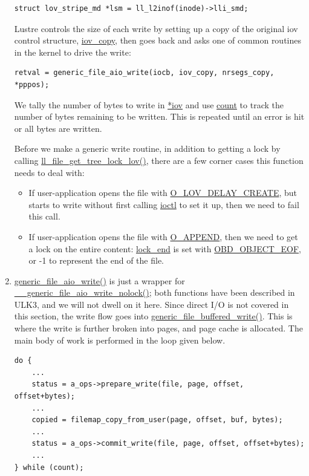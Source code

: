 \begin{enumerate}
\begin{Verbatim} 
struct lov_stripe_md *lsm = ll_l2inof(inode)->lli_smd; 
\end{Verbatim}

Lustre controls the size of each write by setting up a copy of the original iov
control structure, \url{iov_copy}, then goes back and asks one of common
routines in the kernel to drive the write:

\begin{Verbatim}
retval = generic_file_aio_write(iocb, iov_copy, nrsegs_copy, *pppos);
\end{Verbatim}

We tally the number of bytes to write in \url{*iov} and use \url{count} to
track the number of bytes remaining to be written. This is repeated until an
error is hit or all bytes are written.

Before we make a generic write routine, in addition to getting a lock by
calling \url{ll_file_get_tree_lock_lov()},  there are a few corner cases this
function needs to deal with:

  \begin{itemize}

  \item If user-application opens the file with \url{O_LOV_DELAY_CREATE}, but
  starts to write without first calling \url{ioctl} to set it up, then we need
  to fail this call.

  \item If user-application opens the file with \url{O_APPEND}, then we need to
  get a lock on the entire content: \url{lock_end} is set with
  \url{OBD_OBJECT_EOF}, or -1 to represent the end of the file.

  \end{itemize}

\item \url{generic_file_aio_write()} is just a wrapper for
\url{__generic_file_aio_write_nolock()}; both functions have been described in
ULK3, and we will not dwell on it here. Since direct I/O is not covered in
this section, the write flow goes into \url{generic_file_buffered_write()}.
This is where the write is further broken into pages, and page cache
is allocated. The main body of work is performed in the loop given below.

\begin{Verbatim}
do {
    ...
    status = a_ops->prepare_write(file, page, offset, offset+bytes);
    ...
    copied = filemap_copy_from_user(page, offset, buf, bytes);
    ...
    status = a_ops->commit_write(file, page, offset, offset+bytes);
    ...
} while (count);
\end{Verbatim}


\end{enumerate}
